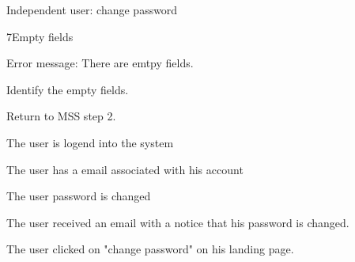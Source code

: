 \begin{uc}{Independent user: change password}
\begin{uc-ext}
	
		\begin{uc-fail}{7}{Empty fields}
		\item Error message: There are emtpy fields.
		\item Identify the empty fields.
		\item Return to MSS step 2.
		\end{uc-fail}
    \end{uc-ext}

    \begin{uc-pre}
    \item The user is logend into the system
    \item The user has a email associated with his account
    \end{uc-pre}

    \begin{uc-post}
    \item The user password is changed
    \item The user received an email with a notice that his password is changed.
    \end{uc-post}

    \begin{uc-trig}
    \item The user clicked on "change password" on his landing page.
    \end{uc-trig}

\end{uc}